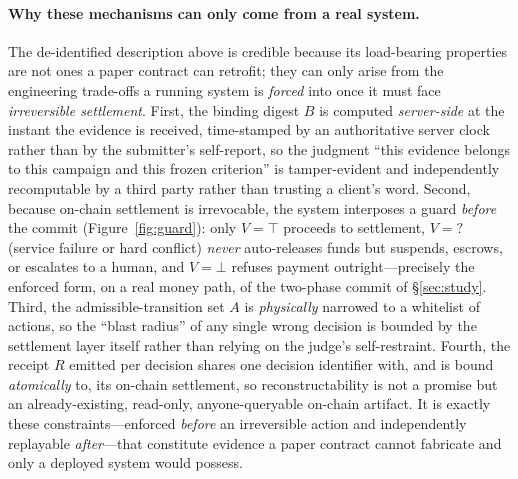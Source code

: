 \documentclass[sigconf,anonymous,review]{acmart}
\begin{document}
\paragraph{Why these mechanisms can only come from a real system.} The de-identified description above is credible because its load-bearing properties are not ones a paper contract can retrofit; they can only arise from the engineering trade-offs a running system is \emph{forced} into once it must face \emph{irreversible settlement}. First, the binding digest $B$ is computed \emph{server-side} at the instant the evidence is received, time-stamped by an authoritative server clock rather than by the submitter's self-report, so the judgment ``this evidence belongs to this campaign and this frozen criterion'' is tamper-evident and independently recomputable by a third party rather than trusting a client's word. Second, because on-chain settlement is irrevocable, the system interposes a guard \emph{before} the commit (Figure~\ref{fig:guard}): only $V=\top$ proceeds to settlement, $V=?$ (service failure or hard conflict) \emph{never} auto-releases funds but suspends, escrows, or escalates to a human, and $V=\bot$ refuses payment outright---precisely the enforced form, on a real money path, of the two-phase commit of \S\ref{sec:study}. Third, the admissible-transition set $A$ is \emph{physically} narrowed to a whitelist of actions, so the ``blast radius'' of any single wrong decision is bounded by the settlement layer itself rather than relying on the judge's self-restraint. Fourth, the receipt $R$ emitted per decision shares one decision identifier with, and is bound \emph{atomically} to, its on-chain settlement, so reconstructability is not a promise but an already-existing, read-only, anyone-queryable on-chain artifact. It is exactly these constraints---enforced \emph{before} an irreversible action and independently replayable \emph{after}---that constitute evidence a paper contract cannot fabricate and only a deployed system would possess.
\end{document}
